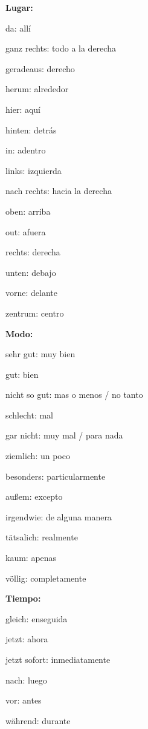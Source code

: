 \textbf{Lugar:}
\begin{myitemize}
\item da: allí
\item ganz rechts: todo a la derecha
\item geradeaus: derecho
\item herum: alrededor
\item hier: aquí
\item hinten: detrás
\item in: adentro
\item links: izquierda
\item nach rechts: hacia la derecha
\item oben: arriba
\item out: afuera
\item rechts: derecha
\item unten: debajo
\item vorne: delante
\item zentrum: centro
\end{myitemize}

\textbf{Modo:}
\begin{myitemize}
\item sehr gut: muy bien
\item gut: bien
\item nicht so gut: mas o menos / no tanto
\item schlecht: mal
\item gar nicht: muy mal / para nada
\item ziemlich: un poco
\item besonders: particularmente
\item außem: excepto
\item irgendwie: de alguna manera
\item tätsalich: realmente
\item kaum: apenas
\item völlig: completamente
\end{myitemize}

\textbf{Tiempo:}
\begin{myitemize}
\item gleich: enseguida
\item jetzt: ahora
\item jetzt sofort: inmediatamente
\item nach: luego
\item vor: antes
\item während: durante
\end{myitemize}

